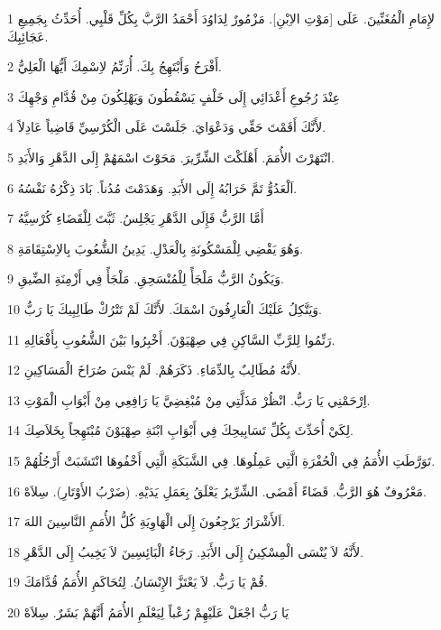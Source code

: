 \par 1 لإِمَامِ الْمُغَنِّينَ. عَلَى [مَوْتِ الاِبْنِ]. مَزْمُورٌ لِدَاوُدَ أَحْمَدُ الرَّبَّ بِكُلِّ قَلْبِي. أُحَدِّثُ بِجَمِيعِ عَجَائِبِكَ.
\par 2 أَفْرَحُ وَأَبْتَهِجُ بِكَ. أُرَنِّمُ لاِسْمِكَ أَيُّهَا الْعَلِيُّ.
\par 3 عِنْدَ رُجُوعِ أَعْدَائِي إِلَى خَلْفٍ يَسْقُطُونَ وَيَهْلِكُونَ مِنْ قُدَّامِ وَجْهِكَ
\par 4 لأَنَّكَ أَقَمْتَ حَقِّي وَدَعْوَايَ. جَلَسْتَ عَلَى الْكُرْسِيِّ قَاضِياً عَادِلاً.
\par 5 انْتَهَرْتَ الأُمَمَ. أَهْلَكْتَ الشِّرِّيرَ. مَحَوْتَ اسْمَهُمْ إِلَى الدَّهْرِ وَالأَبَدِ.
\par 6 اَلْعَدُوُّ تَمَّ خَرَابُهُ إِلَى الأَبَدِ. وَهَدَمْتَ مُدُناً. بَادَ ذِكْرُهُ نَفْسُهُ.
\par 7 أَمَّا الرَّبُّ فَإِلَى الدَّهْرِ يَجْلِسُ. ثَبَّتَ لِلْقَضَاءِ كُرْسِيَّهُ
\par 8 وَهُوَ يَقْضِي لِلْمَسْكُونَةِ بِالْعَدْلِ. يَدِينُ الشُّعُوبَ بِالاِسْتِقَامَةِ.
\par 9 وَيَكُونُ الرَّبُّ مَلْجَأً لِلْمُنْسَحِقِ. مَلْجَأً فِي أَزْمِنَةِ الضِّيقِ.
\par 10 وَيَتَّكِلُ عَلَيْكَ الْعَارِفُونَ اسْمَكَ. لأَنَّكَ لَمْ تَتْرُكْ طَالِبِيكَ يَا رَبُّ.
\par 11 رَنِّمُوا لِلرَّبِّ السَّاكِنِ فِي صِهْيَوْنَ. أَخْبِرُوا بَيْنَ الشُّعُوبِ بِأَفْعَالِهِ.
\par 12 لأَنَّهُ مُطَالِبٌ بِالدِّمَاءِ. ذَكَرَهُمْ. لَمْ يَنْسَ صُرَاخَ الْمَسَاكِينِ.
\par 13 اِرْحَمْنِي يَا رَبُّ. انْظُرْ مَذَلَّتِي مِنْ مُبْغِضِيَّ يَا رَافِعِي مِنْ أَبْوَابِ الْمَوْتِ.
\par 14 لِكَيْ أُحَدِّثَ بِكُلِّ تَسَابِيحِكَ فِي أَبْوَابِ ابْنَةِ صِهْيَوْنَ مُبْتَهِجاً بِخَلاَصِكَ.
\par 15 تَوَرَّطَتِ الأُمَمُ فِي الْحُفْرَةِ الَّتِي عَمِلُوهَا. فِي الشَّبَكَةِ الَّتِي أَخْفُوهَا انْتَشَبَتْ أَرْجُلُهُمْ.
\par 16 مَعْرُوفٌ هُوَ الرَّبُّ. قَضَاءً أَمْضَى. الشِّرِّيرُ يَعْلَقُ بِعَمَلِ يَدَيْهِ. (ضَرْبُ الأَوْتَارِ). سِلاَهْ.
\par 17 اَلأَشْرَارُ يَرْجِعُونَ إِلَى الْهَاوِيَةِ كُلُّ الأُمَمِ النَّاسِينَ اللهَ.
\par 18 لأَنَّهُ لاَ يُنْسَى الْمِسْكِينُ إِلَى الأَبَدِ. رَجَاءُ الْبَائِسِينَ لاَ يَخِيبُ إِلَى الدَّهْرِ.
\par 19 قُمْ يَا رَبُّ. لاَ يَعْتَزَّ الإِنْسَانُ. لِتُحَاكَمِ الأُمَمُ قُدَّامَكَ.
\par 20 يَا رَبُّ اجْعَلْ عَلَيْهِمْ رُعْباً لِيَعْلَمِ الأُمَمُ أَنَّهُمْ بَشَرٌ. سِلاَهْ

